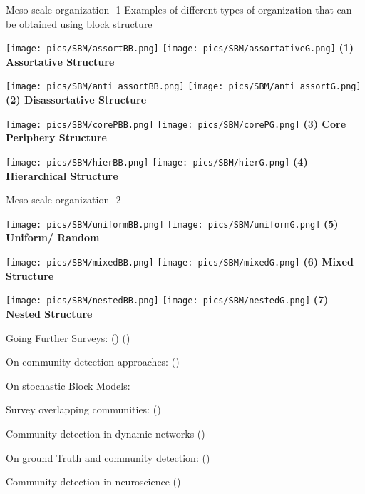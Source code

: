 \begin{textbox}{Meso-scale organization -1}
    Examples of different types of organization that can be obtained using block structure

    \centering

    \texttt{[image: pics/SBM/assortBB.png]}
    \texttt{[image: pics/SBM/assortativeG.png]}
    \textbf{(1) Assortative Structure}

    \texttt{[image: pics/SBM/anti\_assortBB.png]}
    \texttt{[image: pics/SBM/anti\_assortG.png]}
    \textbf{(2) Disassortative Structure}

    \texttt{[image: pics/SBM/corePBB.png]}
    \texttt{[image: pics/SBM/corePG.png]}
    \textbf{(3) Core Periphery Structure}

    \texttt{[image: pics/SBM/hierBB.png]}
    \texttt{[image: pics/SBM/hierG.png]}
    \textbf{(4) Hierarchical Structure}
\end{textbox}


\begin{textbox}{Meso-scale organization -2}
    \centering

    \texttt{[image: pics/SBM/uniformBB.png]}
    \texttt{[image: pics/SBM/uniformG.png]}
    \textbf{(5) Uniform/ Random}

    \texttt{[image: pics/SBM/mixedBB.png]}
    \texttt{[image: pics/SBM/mixedG.png]}
    \textbf{(6) Mixed Structure}

    \texttt{[image: pics/SBM/nestedBB.png]}
    \texttt{[image: pics/SBM/nestedG.png]}
    \textbf{(7) Nested Structure}

\end{textbox}


\begin{textbox}{Going Further}
    Surveys: (\cite{fortunato2010community}) (\cite{fortunato2016community})

    On community detection approaches: (\cite{rosvall2019different})

    On stochastic Block Models:\cite{funke2019stochastic}

    Survey overlapping communities: (\cite{xie2013overlapping})

    Community detection in dynamic networks (\cite{rossetti2018community})

    On ground Truth and community detection: (\cite{peel2017ground})

    Community detection in neuroscience (\cite{betzel2020community})
\end{textbox}